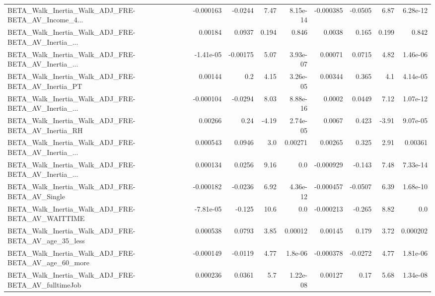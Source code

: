 \begin{tabular}{lrrrrrrrr}
BETA\_Walk\_Inertia\_Walk\_ADJ\_FRE-BETA\_AV\_Income\_4... &   -0.000163 &      -0.0244 &     7.47 & 8.15e-14 &  -0.000385 &     -0.0505 &         6.87 &      6.28e-12 \\
BETA\_Walk\_Inertia\_Walk\_ADJ\_FRE-BETA\_AV\_Inertia\_... &     0.00184 &       0.0937 &    0.194 &    0.846 &     0.0038 &       0.165 &        0.199 &         0.842 \\
BETA\_Walk\_Inertia\_Walk\_ADJ\_FRE-BETA\_AV\_Inertia\_... &   -1.41e-05 &     -0.00175 &     5.07 & 3.93e-07 &    0.00071 &      0.0715 &         4.82 &      1.46e-06 \\
BETA\_Walk\_Inertia\_Walk\_ADJ\_FRE-BETA\_AV\_Inertia\_PT  &     0.00144 &          0.2 &     4.15 & 3.26e-05 &    0.00344 &       0.365 &          4.1 &      4.14e-05 \\
BETA\_Walk\_Inertia\_Walk\_ADJ\_FRE-BETA\_AV\_Inertia\_... &   -0.000104 &      -0.0294 &     8.03 & 8.88e-16 &     0.0002 &      0.0449 &         7.12 &      1.07e-12 \\
BETA\_Walk\_Inertia\_Walk\_ADJ\_FRE-BETA\_AV\_Inertia\_RH  &     0.00266 &         0.24 &    -4.19 & 2.74e-05 &     0.0067 &       0.423 &        -3.91 &      9.07e-05 \\
BETA\_Walk\_Inertia\_Walk\_ADJ\_FRE-BETA\_AV\_Inertia\_... &    0.000543 &       0.0946 &      3.0 &  0.00271 &    0.00265 &       0.325 &         2.91 &       0.00361 \\
BETA\_Walk\_Inertia\_Walk\_ADJ\_FRE-BETA\_AV\_Inertia\_... &    0.000134 &       0.0256 &     9.16 &      0.0 &  -0.000929 &      -0.143 &         7.48 &      7.33e-14 \\
BETA\_Walk\_Inertia\_Walk\_ADJ\_FRE-BETA\_AV\_Single      &   -0.000182 &      -0.0236 &     6.92 & 4.36e-12 &  -0.000457 &     -0.0507 &         6.39 &      1.68e-10 \\
BETA\_Walk\_Inertia\_Walk\_ADJ\_FRE-BETA\_AV\_WAITTIME    &   -7.81e-05 &       -0.125 &     10.6 &      0.0 &  -0.000213 &      -0.265 &         8.82 &           0.0 \\
BETA\_Walk\_Inertia\_Walk\_ADJ\_FRE-BETA\_AV\_age\_35\_less &    0.000538 &       0.0793 &     3.85 &  0.00012 &    0.00145 &       0.179 &         3.72 &      0.000202 \\
BETA\_Walk\_Inertia\_Walk\_ADJ\_FRE-BETA\_AV\_age\_60\_more &   -0.000149 &      -0.0119 &     4.77 &  1.8e-06 &  -0.000378 &     -0.0272 &         4.77 &      1.81e-06 \\
BETA\_Walk\_Inertia\_Walk\_ADJ\_FRE-BETA\_AV\_fulltimeJob &    0.000236 &       0.0361 &      5.7 & 1.22e-08 &    0.00127 &        0.17 &         5.68 &      1.34e-08 \\

\end{tabular}
